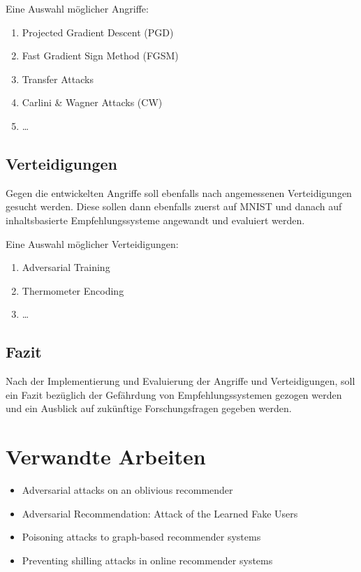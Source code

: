 \documentclass{scrartcl}
\begin{document}
			Eine Auswahl möglicher Angriffe:
			\begin{enumerate}
				\item Projected Gradient Descent (PGD) \cite{kurakin2016adversarial}
				\item Fast Gradient Sign Method (FGSM) \cite{goodfellow2014explaining}
				\item Transfer Attacks \cite{papernot2017practical}
				\item Carlini \& Wagner Attacks (CW) \cite{carlini2017towards}
				\item …
			\end{enumerate}
		
		\pagebreak
		\subsection{Verteidigungen}
			Gegen die entwickelten Angriffe soll ebenfalls nach angemessenen Verteidigungen gesucht werden. Diese sollen dann ebenfalls zuerst auf MNIST und danach auf inhaltsbasierte Empfehlungssysteme angewandt und evaluiert werden.
			

			Eine Auswahl möglicher Verteidigungen:
			\begin{enumerate}
				\item Adversarial Training \cite{tramer2017ensemble}
				\item Thermometer Encoding \cite{buckman2018thermometer}
				\item …
			\end{enumerate}
		
		\subsection{Fazit}
			Nach der Implementierung und Evaluierung der Angriffe und Verteidigungen, soll ein Fazit bezüglich der Gefährdung von Empfehlungssystemen gezogen werden und ein Ausblick auf zukünftige Forschungsfragen gegeben werden.

	
	\section{Verwandte Arbeiten}
	\begin{itemize}
		\item Adversarial attacks on an oblivious recommender \cite{christakopoulou2019adversarial}
		\item Adversarial Recommendation:  Attack of the Learned Fake Users \cite{christakopoulou2018adversarial}
		\item Poisoning attacks to graph-based recommender systems \cite{fang2018poisoning}
		\item Preventing shilling attacks in online recommender systems \cite{chirita2005preventing}
	\end{itemize}

	\printbibliography
\end{document}
